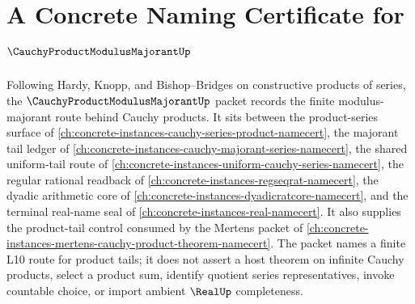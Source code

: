 \chapter{A Concrete Naming Certificate for $\CauchyProductModulusMajorantUp$}
\label{ch:concrete-instances-cauchy-product-modulus-majorant-namecert}

Following Hardy, Knopp, and Bishop--Bridges on constructive products of series, the $\CauchyProductModulusMajorantUp$ packet records the finite modulus-majorant route behind Cauchy products. It sits between the product-series surface of \autoref{ch:concrete-instances-cauchy-series-product-namecert}, the majorant tail ledger of \autoref{ch:concrete-instances-cauchy-majorant-series-namecert}, the shared uniform-tail route of \autoref{ch:concrete-instances-uniform-cauchy-series-namecert}, the regular rational readback of \autoref{ch:concrete-instances-regseqrat-namecert}, the dyadic arithmetic core of \autoref{ch:concrete-instances-dyadicratcore-namecert}, and the terminal real-name seal of \autoref{ch:concrete-instances-real-namecert}. It also supplies the product-tail control consumed by the Mertens packet of \autoref{ch:concrete-instances-mertens-cauchy-product-theorem-namecert}. The packet names a finite L10 route for product tails; it does not assert a host theorem on infinite Cauchy products, select a product sum, identify quotient series representatives, invoke countable choice, or import ambient $\RealUp$ completeness.

